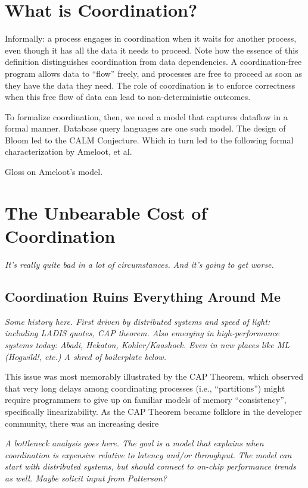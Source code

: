 \documentclass{sig-alternate}
\begin{document}
\section{What is Coordination?}
Informally: a process engages in coordination when it waits for another process, even though it has all the data it needs to proceed.  Note how the essence of this definition distinguishes coordination from data dependencies.  A coordination-free program allows data to ``flow'' freely, and processes are free to proceed as soon as they have the data they need.  The role of coordination is to enforce correctness when this free flow of data can lead to non-deterministic outcomes.

To formalize coordination, then, we need a model that captures dataflow in a formal manner.  Database query languages are one such model. The design of Bloom led to the CALM Conjecture.  Which in turn led to the following formal characterization by Ameloot, et al.  

Gloss on Ameloot's model.

\section{The Unbearable Cost of Coordination}
\label{sec:costs}
\emph{It's really quite bad in a lot of circumstances.  And it's going to get worse.}
\subsection{Coordination Ruins Everything Around Me}
\emph{Some history here.  First driven by distributed systems and speed of light: including LADIS quotes, CAP theorem.  Also emerging in high-performance systems today: Abadi, Hekaton, Kohler/Kaashoek.  Even in new places like ML (Hogwild!, etc.)  A shred of boilerplate below.}

This issue was most memorably illustrated by the CAP Theorem, which observed that very long delays among coordinating processes (i.e., ``partitions'') might require programmers to give up on familiar models of memory ``consistency'', specifically linearizability.  As the CAP Theorem became folklore in the developer community, there was an increasing desire 


\emph{A bottleneck analysis goes here.  The goal is a model that explains when coordination is expensive relative to latency and/or throughput. The model can start with distributed systems, but should connect to on-chip performance trends as well.  Maybe solicit input from Patterson?}
\end{document}
